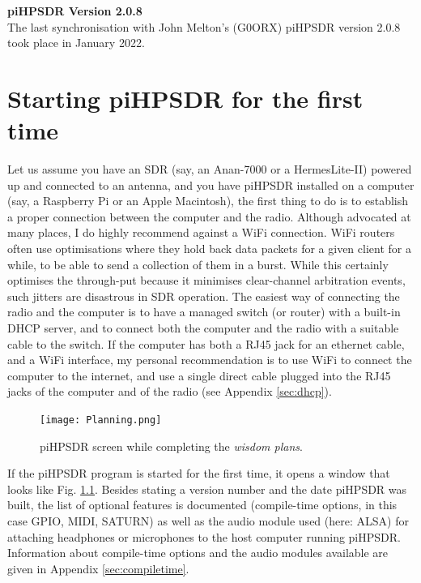 \documentclass[12pt]{book}
\def\pH{pi\-HPSDR\xspace}
\begin{document}
\medskip
\textbf{\pH Version 2.0.8}\\
The last synchronisation with John Melton's (G0ORX) \pH version 2.0.8 took place in January 2022.
\chapter{Starting \pH for the first time}
Let us assume you have an SDR (say, an Anan-7000 or a HermesLite-II) powered up and connected to an antenna,
and you have \pH installed on a computer (say, a Raspberry Pi or an Apple Macintosh), the first thing to
do is to establish a proper connection between the computer and the radio. Although advocated at many
places,
I do highly recommend against a WiFi connection. WiFi routers often use optimisations where they hold
back data packets for a given client for a while, to be able to send a collection of them in a burst. While
this certainly optimises the through-put because it minimises clear-channel arbitration events, such jitters
are disastrous in SDR operation. The easiest way of connecting the radio and the computer is to have a
managed switch (or router) with a built-in DHCP server, and to connect both the computer and the radio with a suitable
cable to the switch. If the computer has both a RJ45 jack for an ethernet cable, and a WiFi interface, my
personal recommendation is to use WiFi to connect the computer to the internet, and use a single direct
cable plugged
into the RJ45 jacks of the computer and of the radio (see Appendix
\ref{sec:dhcp}).

\begin{figure}
\center
\texttt{[image: Planning.png]}
\caption{\pH screen while completing the \textit{wisdom plans}.}
\label{fig:Planning}
\end{figure}

If the \pH program is started for the first time, it opens a window that looks like Fig. \ref{fig:Planning}.
Besides stating a version number and the date \pH was built, the list of optional features is
documented (compile-time options,
in this case  GPIO, MIDI, SATURN) as well as the audio module used (here: ALSA) for attaching headphones
or microphones to the host computer running \pH. Information about compile-time options and the
audio modules available are given in Appendix \ref{sec:compiletime}.
\end{document}
